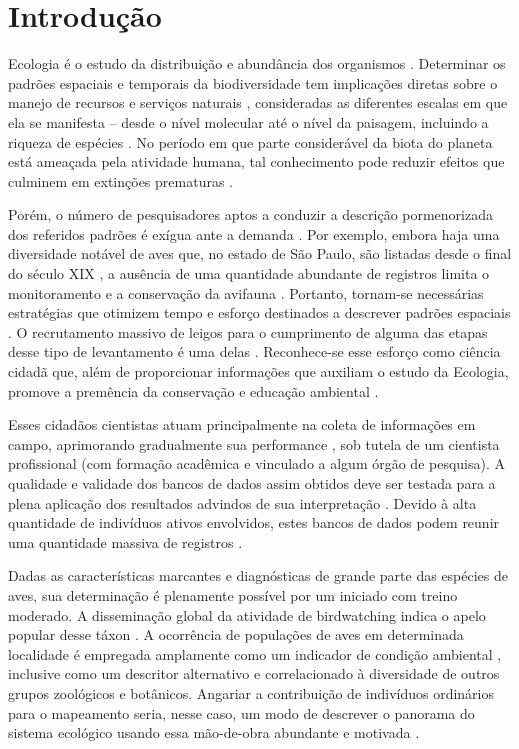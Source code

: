 \section{Introdução}

Ecologia é o estudo da distribuição e abundância dos organismos \cite{Begon2007}. Determinar os padrões espaciais e temporais da biodiversidade tem implicações diretas sobre o manejo de recursos e serviços naturais \cite{groom2006principles,Roque2018}, consideradas as diferentes escalas em que ela se manifesta – desde o nível molecular até o nível da paisagem, incluindo a riqueza de espécies \cite{magurran2013measuring}. No período em que parte considerável da biota do planeta está ameaçada pela atividade humana, tal conhecimento pode reduzir efeitos que culminem em extinções prematuras \cite{groom2006principles}.

Porém, o número de pesquisadores aptos a conduzir a descrição pormenorizada dos referidos padrões é exígua ante a demanda \cite{Amano2016,Greenwood2007}. Por exemplo, embora haja uma diversidade notável de aves que, no estado de São Paulo, são listadas desde
o final do século XIX \cite{Silveira2011}, a ausência de uma quantidade abundante de registros limita o monitoramento e a conservação da avifauna \cite{Amano2016}. Portanto, tornam-se necessárias estratégias que otimizem tempo e esforço destinados a descrever padrões espaciais \cite{Amano2016,Greenwood2007}. O recrutamento massivo de leigos para o cumprimento de alguma das etapas desse tipo de levantamento é uma delas \cite{Lepczyk2005,Phillips2014,Tredick2017,Horns2018}. Reconhece-se esse esforço como ciência cidadã \cite{Kullenberg2016} que, além de proporcionar informações que auxiliam o estudo da Ecologia, promove a premência da conservação e educação ambiental \cite{DiasdaSilva2019,Bonney2016}. 

Esses cidadãos cientistas atuam principalmente na coleta de informações em campo, aprimorando gradualmente sua performance \cite{Phillips2014,Kieslinger2019}, sob tutela de um cientista profissional (com formação acadêmica e vinculado a algum órgão de pesquisa). A qualidade e validade dos bancos de dados assim obtidos deve ser testada para a plena aplicação dos resultados advindos de sua interpretação \cite{Phillips2014,Tredick2017,Kieslinger2019}. Devido à alta quantidade de indivíduos ativos envolvidos, estes bancos de dados podem reunir uma quantidade massiva de registros \cite{Alexandrino2018}.

Dadas as características marcantes e diagnósticas de grande parte das espécies de aves, sua determinação é plenamente possível por um iniciado com treino moderado. A disseminação global da atividade de birdwatching indica o apelo popular desse táxon \cite{Lepczyk2005,Alexandrino2018}. A ocorrência de populações de aves em determinada localidade é empregada amplamente como um indicador de condição ambiental \cite{Lepczyk2005,Greenwood2007,Schubert2019}, inclusive como um descritor alternativo e correlacionado à diversidade de outros grupos zoológicos e botânicos. Angariar a contribuição de indivíduos ordinários para o mapeamento seria, nesse caso, um modo de descrever o panorama do sistema ecológico usando essa mão-de-obra abundante e motivada  \cite{Lepczyk2005,Klemann-Junior2017,Alexandrino2018}.


